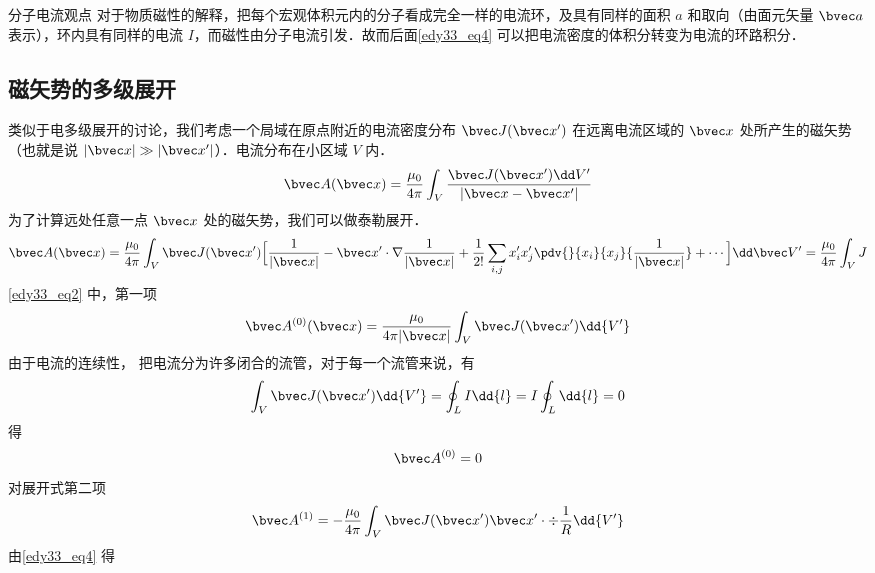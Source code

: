 
\begin{lemma}{分子电流观点}
对于物质磁性的解释，把每个宏观体积元内的分子看成完全一样的电流环，及具有同样的面积 $a$ 和取向（由面元矢量 $\bvec a$ 表示），环内具有同样的电流 $I$，而磁性由分子电流引发．故而后面\autoref{edy33_eq4} 可以把电流密度的体积分转变为电流的环路积分．
\end{lemma}
\subsection{磁矢势的多级展开}
类似于电多级展开的讨论，我们考虑一个局域在原点附近的电流密度分布 $\bvec J(\bvec x')$ 在远离电流区域的 $\bvec x$ 处所产生的磁矢势（也就是说 $|\bvec x|\gg|\bvec x'|$）．电流分布在小区域 $V$ 内．
\begin{equation}
\bvec A(\bvec x)=\dfrac {\mu_0}{4\pi} \int_V \dfrac{ \bvec J(\bvec x^{\prime})\dd V^{\prime}}{|\bvec x - \bvec x'|}\label{edy33_eq1}
\end{equation}
为了计算远处任意一点 $\bvec x$ 处的磁矢势，我们可以做泰勒展开．
\begin{equation}
\bvec A(\bvec x)=\dfrac {\mu_0}{4\pi}\int_V \bvec J(\bvec x')\Big[\dfrac{1}{|\bvec x|}-\bvec x'\cdot\nabla \dfrac{1}{|\bvec x|}+\dfrac{1}{2!}\sum_{i,j}x_i^{\prime}x_j^{\prime}\pdv{}{x_i}{x_j}{\dfrac 1 {|\bvec x|}}+\cdots\Big]\dd \bvec V^{\prime}\\
=\dfrac{\mu_0}{4\pi}\int_V J
\label{edy33_eq2}
\end{equation}
\autoref{edy33_eq2} 中，第一项
\begin{equation}
\bvec A^{(0)}(\bvec x)=\dfrac {\mu_0}{4\pi |\bvec x|}\int_V \bvec J(\bvec x')\dd{ V^{\prime}}\label{edy33_eq3}
\end{equation}
由于电流的连续性，%
把电流分为许多闭合的流管，对于每一个流管来说，有
\begin{equation}
\int_V \bvec J(\bvec x^{\prime}) \dd{V^{\prime}}=\oint_L I\dd{l}=I\oint_L \dd{l}=0\label{edy33_eq4}
\end{equation}
得\begin{equation}
\bvec A^{(0)}=0\label{edy33_eq5}
\end{equation}
对展开式第二项
\begin{equation}
\bvec A^{(1)}=-\dfrac{\mu_0 }{4\pi}\int_V \bvec J(\bvec x^{\prime})\bvec x^{\prime}\cdot\div\dfrac1 R\dd{V^{\prime}}\label{edy33_eq6}
\end{equation}
由\autoref{edy33_eq4} 得
